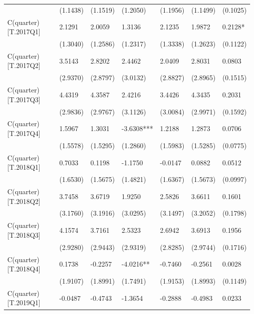 \begin{table}
\begin{center}
\begin{tabular}{lllllll}
                         & (1.1438)   & (1.1519)   & (1.2050)   & (1.1956)   & (1.1499)   & (0.1025)    \\
C(quarter)[T.2017Q1]     & 2.1291     & 2.0059     & 1.3136     & 2.1235     & 1.9872     & 0.2128*     \\
                         & (1.3040)   & (1.2586)   & (1.2317)   & (1.3338)   & (1.2623)   & (0.1122)    \\
C(quarter)[T.2017Q2]     & 3.5143     & 2.8202     & 2.4462     & 2.0409     & 2.8031     & 0.0803      \\
                         & (2.9370)   & (2.8797)   & (3.0132)   & (2.8827)   & (2.8965)   & (0.1515)    \\
C(quarter)[T.2017Q3]     & 4.4319     & 4.3587     & 2.4216     & 3.4426     & 4.3435     & 0.2031      \\
                         & (2.9836)   & (2.9767)   & (3.1126)   & (3.0084)   & (2.9971)   & (0.1592)    \\
C(quarter)[T.2017Q4]     & 1.5967     & 1.3031     & -3.6308*** & 1.2188     & 1.2873     & 0.0706      \\
                         & (1.5578)   & (1.5295)   & (1.2860)   & (1.5983)   & (1.5285)   & (0.0775)    \\
C(quarter)[T.2018Q1]     & 0.7033     & 0.1198     & -1.1750    & -0.0147    & 0.0882     & 0.0512      \\
                         & (1.6530)   & (1.5675)   & (1.4821)   & (1.6367)   & (1.5673)   & (0.0997)    \\
C(quarter)[T.2018Q2]     & 3.7458     & 3.6719     & 1.9250     & 2.5826     & 3.6611     & 0.1601      \\
                         & (3.1760)   & (3.1916)   & (3.0295)   & (3.1497)   & (3.2052)   & (0.1798)    \\
C(quarter)[T.2018Q3]     & 4.1574     & 3.7161     & 2.5323     & 2.6942     & 3.6913     & 0.1956      \\
                         & (2.9280)   & (2.9443)   & (2.9319)   & (2.8285)   & (2.9744)   & (0.1716)    \\
C(quarter)[T.2018Q4]     & 0.1738     & -0.2257    & -4.0216**  & -0.7460    & -0.2561    & 0.0028      \\
                         & (1.9107)   & (1.8991)   & (1.7491)   & (1.9153)   & (1.8993)   & (0.1149)    \\
C(quarter)[T.2019Q1]     & -0.0487    & -0.4743    & -1.3654    & -0.2888    & -0.4983    & 0.0233      \\

\end{tabular}
\end{center}
\end{table}
